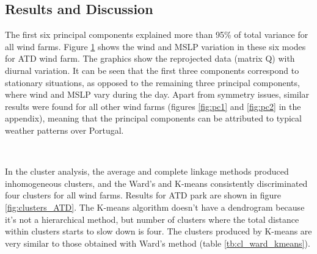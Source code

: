 \subsection{Results and Discussion}

The first six principal components explained more than 95\% of total variance for all wind farms. Figure \ref{fig:pca_loadings} shows the wind and MSLP variation in these six modes for ATD wind farm. The graphics show the reprojected data (matrix Q) with diurnal variation. It can be seen that the first three components correspond to stationary situations, as opposed to the remaining three principal components, where wind and MSLP vary during the day. Apart from symmetry issues, similar results were found for all other wind farms (figures \ref{fig:pc1} and \ref{fig:pc2} in the appendix), meaning that the principal components can be attributed to typical weather patterns over Portugal. 

\begin{figure}[!htp]
    \centering
    \\    
    \label{fig:pca_loadings}
\end{figure}
\FloatBarrier

In the cluster analysis, the average and complete linkage methods produced inhomogeneous clusters, and the Ward's and K-means consistently discriminated four clusters for all wind farms. Results for ATD park are shown in figure \ref{fig:clusters_ATD}. The K-means algorithm doesn't have a dendrogram because it's not a hierarchical method, but number of clusters where the total distance within clusters starts to slow down is four. The clusters produced by K-means are very similar to those obtained with Ward's method (table \ref{tb:cl_ward_kmeans}). 


